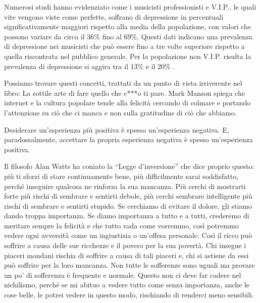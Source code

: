 \documentclass[12pt]{book} %
\begin{document}
Numerosi studi hanno evidenziato come i musicisti professionisti e V.I.P., le quali vite vengono viste come perfette, soffrano di depressione in percentuali significativamente maggiori rispetto alla media della popolazione, con valori che possono variare da circa il 36\% fino al 69\%. Questi dati indicano una prevalenza di depressione nei musicisti che può essere fino a tre volte superiore rispetto a quella riscontrata nel pubblico generale. Per la popolazione non V.I.P. risulta la prevalenza di depressione si aggira tra il 13\% e il 20\%   .

Possiamo trovare questi concetti, trattati da un punto di vista irriverente nel libro: La sottile arte di fare quello
che c***o ti pare. Mark Manson spiega che internet e la cultura popolare
tende alla felicità cercando di colmare e portando l'attenzione su ciò che ci manca e non sulla gratitudine di ciò che abbiamo.

Desiderare un'esperienza più positiva è spesso un'esperienza negativa. 
E, paradossalmente, accettare la propria esperienza negativa è spesso un'esperienza positiva.

Il filosofo Alan Watts ha coniato la “Legge d'inversione” che dice proprio questo: 
più ti sforzi di stare continuamente bene, più difficilmente sarai soddisfatto, perché inseguire qualcosa ne rinforza la sua mancanza. Più cerchi di mostrarti forte più rischi di sembrare e sentirti debole, più cerchi sembrare intelligente più rischi di sembrare e sentirti stupido. Se cerchiamo di evitare il dolore, gli stiamo dando troppa importanza. Se diamo importanza a tutto e a tutti, crederemo di
meritare sempre la felicità e che tutto vada come vorremmo, così potremmo vedere ogni avversità come un ingiustizia o
un'offesa personale. Così il ricco può soffrire a causa delle sue ricchezze e il povero per la sua
povertà. Chi insegue i piaceri mondani rischia di soffrire a causa di tali piaceri e, chi si astiene da essi può soffrire per la loro
mancanza. Non tutte le sofferenze sono uguali ma provare un po' di sofferenza è frequente e normale.
Questo non ci deve far cadere nel nichilismo, perché se mi abituo a vedere tutto come senza importanza, anche le cose belle, le potrei vedere in questo modo, rischiando di renderci meno sensibili.
\end{document}
